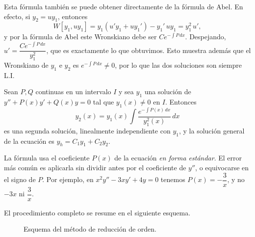 Esta f\'ormula tambi\'en se puede obtener directamente de la f\'ormula de Abel. En efecto, si $y_2=uy_1$, entonces
\[
W[y_1,uy_1]=y_1\left(u'y_1+uy_1'\right)-y_1'\,uy_1=y_1^2\,u',
\]
y por la f\'ormula de Abel este Wronskiano debe ser $Ce^{-\int P\,dx}$. Despejando, $u'=\dfrac{Ce^{-\int P\,dx}}{y_1^2}$, que es exactamente lo que obtuvimos. Esto muestra adem\'as que el Wronskiano de $y_1$ e $y_2$ es $e^{-\int P\,dx}\neq0$, por lo que las dos soluciones son siempre L.I.

\begin{theorem}
    Sean $P,Q$ continuas en un intervalo $I$ y sea $y_1$ una soluci\'on de $y''+P(x)y'+Q(x)y=0$ tal que $y_1(x)\neq0$ en $I$. Entonces
    \[
    y_2(x)=y_1(x)\int\dfrac{e^{-\int P(x)\,dx}}{y_1^2(x)}\,dx
    \]
    es una segunda soluci\'on, linealmente independiente con $y_1$, y la soluci\'on general de la ecuaci\'on es $y_h=C_1y_1+C_2y_2$.
\end{theorem}

\begin{remark}
    La f\'ormula usa el coeficiente $P(x)$ de la ecuaci\'on \emph{en forma est\'andar}. El error m\'as com\'un es aplicarla sin dividir antes por el coeficiente de $y''$, o equivocarse en el signo de $P$. Por ejemplo, en $x^2y''-3xy'+4y=0$ tenemos $P(x)=-\dfrac{3}{x}$, y no $-3x$ ni $\dfrac{3}{x}$.
\end{remark}

El procedimiento completo se resume en el siguiente esquema.

\begin{figure}[h!]
    \centering
    \caption{Esquema del m\'etodo de reducci\'on de orden.}
    \label{fig:esquema_reduccion}
\end{figure}

